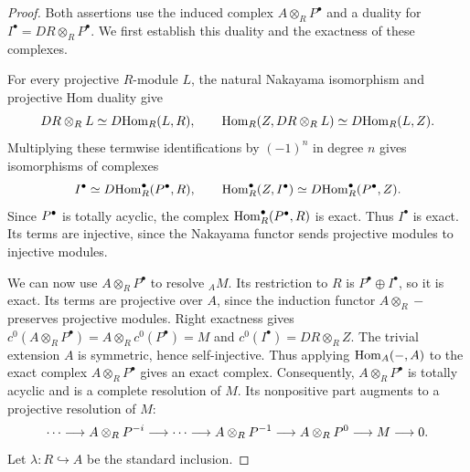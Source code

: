\documentclass[11pt]{article}
\begin{document}
\begin{proof}
Both assertions use the induced complex $A\otimes_RP^\bullet$
and a duality for $I^\bullet=DR\otimes_RP^\bullet$.
We first establish this duality and the exactness of these complexes.


For every projective $R$-module $L$, the natural Nakayama isomorphism
and projective Hom duality give
\begin{equation*}
 DR\otimes_RL\simeq D{\rm Hom}_R(L,R),\qquad
 {\rm Hom}_R(Z,DR\otimes_RL)\simeq D{\rm Hom}_R(L,Z).
\end{equation*}
Multiplying these termwise identifications by $(-1)^n$ in degree $n$ gives
isomorphisms of complexes
\[
 I^\bullet\simeq D{\rm Hom}_R^\bullet(P^\bullet,R),\qquad
 {\rm Hom}_R^\bullet(Z,I^\bullet)\simeq D{\rm Hom}_R^\bullet(P^\bullet,Z).
\]
Since $P^{\bullet}$ is totally acyclic, the complex ${\rm Hom}_R^\bullet(P^\bullet, R)$ is exact.
Thus $I^\bullet$ is exact. Its terms are injective, since the
Nakayama functor sends projective modules to injective modules.

We can now use $A\otimes_RP^\bullet$ to resolve ${_A}M$. Its restriction
to $R$ is $P^\bullet\oplus I^\bullet$, so it is exact. Its terms
are projective over $A$, since the induction functor $A\otimes_R-$ preserves projective modules.
Right exactness gives
$c^0(A\otimes_RP^\bullet)=A\otimes_Rc^0(P^\bullet)=M$ and
$c^0(I^\bullet)=DR\otimes_RZ$.
The trivial extension $A$ is symmetric, hence self-injective.
Thus applying ${\rm Hom}_A(-,A)$ to the exact complex
$A\otimes_RP^\bullet$ gives an exact complex. Consequently,
$A\otimes_RP^\bullet$ is totally acyclic and is a complete resolution
of $M$.
Its nonpositive part
augments to a projective resolution of $M$:
$$
\cdots \longrightarrow A\otimes_RP^{-i}\longrightarrow\cdots\longrightarrow A\otimes_RP^{-1}\longrightarrow A\otimes_RP^0\longrightarrow M\longrightarrow 0.
$$
Let $\lambda:R\hookrightarrow A$ be the standard inclusion.


\end{proof}
\end{document}

